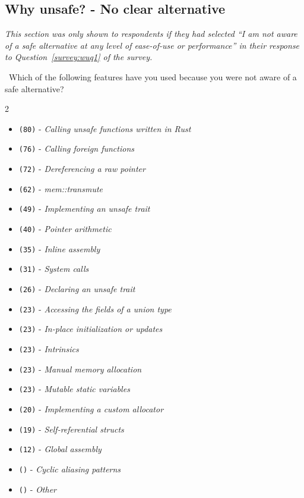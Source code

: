 \subsection{Why unsafe? - No clear alternative}
\label{survey:sec:wunq}
\textit{This section was only shown to respondents if they had selected ``\textit{I am not aware of a safe alternative at any level of ease-of-use or performance}'' in their response to Question~\ref{survey:wuq1} of the survey.}
\begin{protocol}
\item \label{survey:wunq1}   \ Which of the following \unsafe features have you used because you were not aware of a safe alternative?
\begin{multicols}{2}
\begin{itemize}
\item \texttt{(80)} - \textit{Calling unsafe functions written in Rust}
\item \texttt{(76)} - \textit{Calling foreign functions}
\item \texttt{(72)} - \textit{Dereferencing a raw pointer}
\item \texttt{(62)} - \textit{mem::transmute}
\item \texttt{(49)} - \textit{Implementing an unsafe trait}
\item \texttt{(40)} - \textit{Pointer arithmetic}
\item \texttt{(35)} - \textit{Inline assembly}
\item \texttt{(31)} - \textit{System calls}
\item \texttt{(26)} - \textit{Declaring an unsafe trait}
\item \texttt{(23)} - \textit{Accessing the fields of a union type}
\item \texttt{(23)} - \textit{In-place initialization or updates}
\item \texttt{(23)} - \textit{Intrinsics}
\item \texttt{(23)} - \textit{Manual memory allocation}
\item \texttt{(23)} - \textit{Mutable static variables}
\item \texttt{(20)} - \textit{Implementing a custom allocator}
\item \texttt{(19)} - \textit{Self-referential structs}
\item \texttt{(12)} - \textit{Global assembly}
\item \texttt{()} - \textit{Cyclic aliasing patterns}
\item \texttt{()} - \textit{Other}

\end{itemize}
\end{multicols}
\end{protocol}
